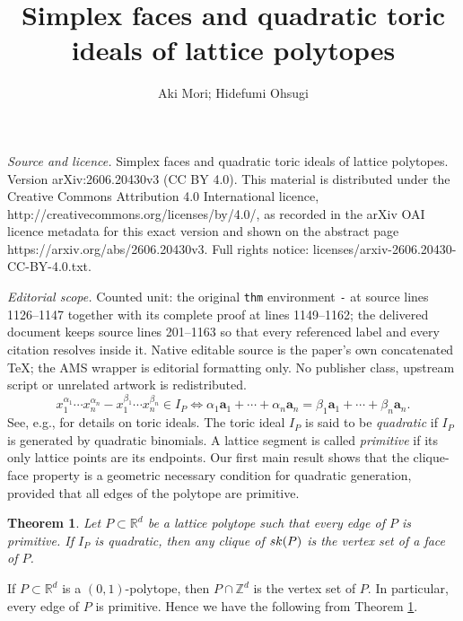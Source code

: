 \documentclass[10pt,a4paper]{amsart}
\newtheorem{thm}{Theorem} [section]
\numberwithin{thm}{section}
\numberwithin{equation}{section}
\def\NZQ{\mathbb}               %
\def\ZZ{{\NZQ Z}}
\def\RR{{\NZQ R}}
\def\ab{{\mathbf a}}
\begin{document}
\title[Simplex faces and quadratic toric ideals of lattice polytope]{Simplex faces and quadratic toric ideals of lattice polytopes}
\author{Aki Mori; Hidefumi Ohsugi}
\date{}
\maketitle
\noindent\emph{Source and licence.} Simplex faces and quadratic toric ideals of lattice polytopes. Version arXiv:2606.20430v3 (CC BY 4.0). This material is distributed under the Creative Commons Attribution 4.0 International licence, http://creativecommons.org/licenses/by/4.0/, as recorded in the arXiv OAI licence metadata for this exact version and shown on the abstract page https://arxiv.org/abs/2606.20430v3. Full rights notice: licenses/arxiv-2606.20430-CC-BY-4.0.txt.\par\smallskip
\noindent\textit{Editorial scope.} Counted unit: the original \texttt{thm} environment \texttt{-} at source lines 1126--1147 together with its complete proof at lines 1149--1162; the delivered document keeps source lines 201--1163 so that every referenced label and every citation resolves inside it. Native editable source is the paper's own concatenated TeX; the AMS wrapper is editorial formatting only. No publisher class, upstream script or unrelated artwork is redistributed.
\begin{equation} \label{basicIP}
    x_1^{\alpha_1} \cdots x_n^{\alpha_n} 
-
x_1^{\beta_1} \cdots x_n^{\beta_n} \in I_P
\iff
\alpha_1 \ab_1 + \cdots + \alpha_n \ab_n
=
\beta_1 \ab_1 + \cdots + \beta_n \ab_n.
\end{equation}
See, e.g., \cite{HHO} for details on toric ideals.
The toric ideal $I_P$ is said to be {\it quadratic}
if $I_P$ is generated by quadratic binomials.
A lattice segment is called \textit{primitive} if its only lattice points are its endpoints.
Our first main result shows that the clique-face property is a geometric necessary condition for quadratic generation, provided that all edges of the polytope are primitive.
\begin{thm}
\label{quadGENE}
Let $P \subset \RR^d$ be a lattice polytope
such that every edge of $P$ is primitive.
If $I_P$ is quadratic,
    then any clique of ${\rm sk}(P)$ is the vertex set of a face of $P$.
\end{thm}

If $P \subset \RR^d$ is a $(0,1)$-polytope, then 
$P \cap \ZZ^d$ is the vertex set of $P$.
In particular, every edge of $P$ is primitive.
Hence we have the following from Theorem \ref{quadGENE}.
\end{document}
